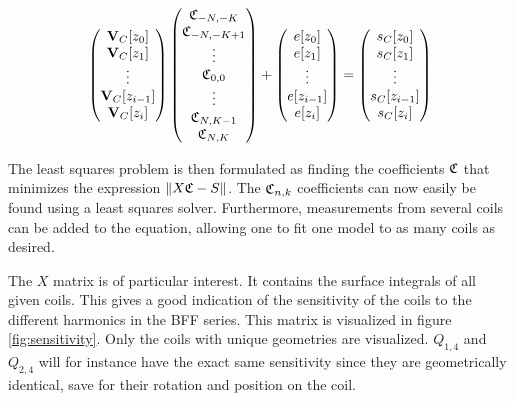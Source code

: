 \begin{equation}
    \begin{pmatrix}
        \vb{V}_C[z_0]     \\ \vb{V}_C[z_{1}] \\ \vdots \\
        \vb{V}_C[z_{i-1}] \\ \vb{V}_C[z_i]
    \end{pmatrix}
    \begin{pmatrix}
        \Cnk[-N, -K] \\ \Cnk[-N, -K+1]\\ \vdots\\
        \Cnk[0, 0]   \\ \vdots \\ \Cnk[N, K-1]\\ \Cnk[N, K]
    \end{pmatrix}
    + \begin{pmatrix}
        e[z_0]     \\ e[z_1]\\ \vdots\\
        e[z_{i-1}] \\ e[z_i]
    \end{pmatrix} =
    \begin{pmatrix}
        s_C[z_0] \\ s_C[z_1] \\ \vdots \\ s_C[z_{i-1}] \\
        s_C[z_i]
    \end{pmatrix}
    \label{eq:matrixmodel}
\end{equation}

The least squares problem is then formulated as finding the
coefficients $\frak{C}$ that minimizes the expression
$\| X\frak{C} - S \|$.
The $\mathfrak{C}_{n,k}$ coefficients can now easily be found using a
least squares solver. Furthermore, measurements from
several coils can be added to the equation, allowing one
to fit one model to as many coils as desired.

The $X$ matrix is of particular interest. It contains the
surface integrals of all given coils. This gives a good
indication of the sensitivity of the coils to the different
harmonics in the BFF series. This matrix is visualized in
figure \ref{fig:sensitivity}. Only the coils with unique
geometries are visualized. $Q_{1,4}$ and $Q_{2,4}$ will
for instance have the exact same sensitivity since they
are geometrically identical, save for their rotation and
position on the coil.

